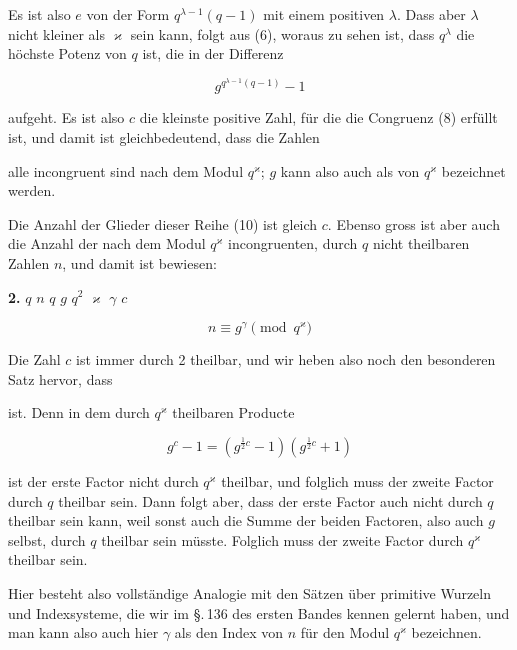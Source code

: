 
Es ist also $e$ von der Form $q^{\lambda-1}(q-1)$ mit einem positiven $\lambda$. Dass aber $\lambda$ nicht kleiner als $\varkappa$ sein kann, folgt aus (6), woraus zu sehen ist, dass $q^\lambda$ die höchste Potenz von $q$ ist, die in der Differenz

\[
g^{q^{\lambda-1}(q-1)} - 1
\]

aufgeht. Es ist also $c$ die kleinste positive Zahl, für die die Congruenz (8) erfüllt ist, und damit ist gleichbedeutend, dass die Zahlen


alle incongruent sind nach dem Modul $q^\varkappa$; $g$ kann also auch als  von $q^\varkappa$ bezeichnet werden.

Die Anzahl der Glieder dieser Reihe (10) ist gleich $c$. Ebenso gross ist aber auch die Anzahl der nach dem Modul $q^\varkappa$ incongruenten, durch $q$ nicht theilbaren Zahlen $n$, und damit ist bewiesen:

\noindent\textbf{2.}  $q$  $n$  $q$  $g$  $q^2$  $\varkappa$  $\gamma$  $c$ 

\[
n \equiv g^\gamma \pmod{q^\varkappa}
\]


Die Zahl $c$ ist immer durch 2 theilbar, und wir heben also noch den besonderen Satz hervor, dass


ist. Denn in dem durch $q^\varkappa$ theilbaren Producte

\[
g^c - 1 = (g^{\frac12 c} - 1)(g^{\frac12 c} + 1)
\]

ist der erste Factor nicht durch $q^\varkappa$ theilbar, und folglich muss der zweite Factor durch $q$ theilbar sein. Dann folgt aber, dass der erste Factor auch nicht durch $q$ theilbar sein kann, weil sonst auch die Summe der beiden Factoren, also auch $g$ selbst, durch $q$ theilbar sein müsste. Folglich muss der zweite Factor durch $q^\varkappa$ theilbar sein.

Hier besteht also vollständige Analogie mit den Sätzen über primitive Wurzeln und Indexsysteme, die wir im \S.\,136 des ersten Bandes kennen gelernt haben, und man kann also auch hier $\gamma$ als den Index von $n$ für den Modul $q^\varkappa$ bezeichnen.
